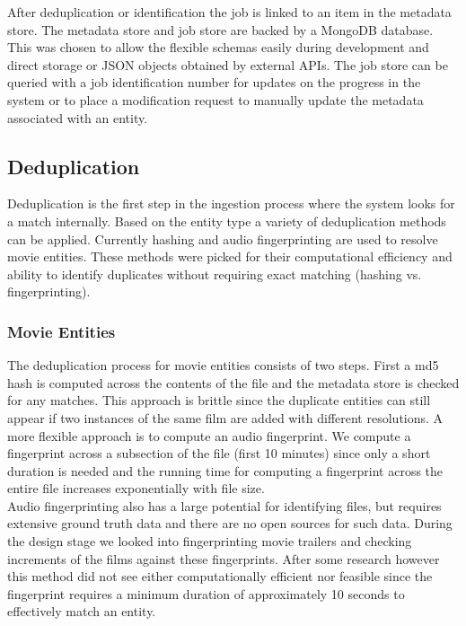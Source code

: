\documentclass[paper=a4, fontsize=11pt]{scrartcl} %
\numberwithin{equation}{section} %
\numberwithin{figure}{section} %
\numberwithin{table}{section} %
\begin{document}
After deduplication or identification the job is linked to an item in the metadata store. The metadata store and job store are backed by a MongoDB database. This was chosen to allow the flexible schemas easily during development and direct storage or JSON objects obtained by external APIs. The job store can be queried with a job identification number for updates on the progress in the system or to place a modification request to manually update the metadata associated with an entity. \\


\subsection{Deduplication}
\label{sec:deduplication}
Deduplication is the first step in the ingestion process where the system looks for a match internally. Based on the entity type a variety of deduplication methods can be applied. Currently hashing and audio fingerprinting are used to resolve movie entities. These methods were picked for their computational efficiency and ability to identify duplicates without requiring exact matching (hashing vs. fingerprinting). \\

\subsubsection{Movie Entities}
\label{sec:dedup-movie-entities}
The deduplication process for movie entities consists of two steps. First a md5 hash is computed across the contents of the file and the metadata store is checked for any matches. This approach is brittle since the duplicate entities can still appear if two instances of the same film are added with different resolutions. A more flexible approach is to compute an audio fingerprint. We compute a fingerprint across a subsection of the file (first 10 minutes) since only a short duration is needed and the running time for computing a fingerprint across the entire file increases exponentially with file size. \\

Audio fingerprinting also has a large potential for identifying files, but requires extensive ground truth data and there are no open sources for such data. During the design stage we looked into fingerprinting movie trailers and checking increments of the films against these fingerprints. After some research however this method did not see either computationally efficient nor feasible since the fingerprint requires a minimum duration of approximately 10 seconds to effectively match an entity. \\
\end{document}
